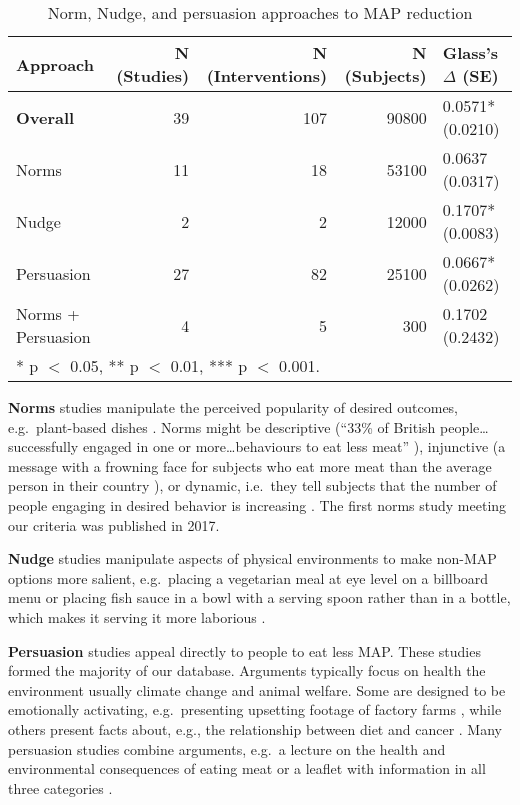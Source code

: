 \documentclass[sn-nature,pdflatex]{sn-jnl}
\begin{document}
\begin{table}[!h]
\centering
\caption{\label{tab:tab:table_one}Norm, Nudge, and persuasion approaches to MAP reduction}
\centering
\begin{tabular}[t]{lrrrl}
\toprule
Approach & N (Studies) & N (Interventions) & N (Subjects) & Glass's $\Delta$ (SE)\\
\midrule
\textbf{Overall} & 39 & 107 & 90800 & 0.0571* (0.0210)\\
Norms & 11 & 18 & 53100 & 0.0637 (0.0317)\\
Nudge & 2 & 2 & 12000 & 0.1707* (0.0083)\\
Persuasion & 27 & 82 & 25100 & 0.0667* (0.0262)\\
Norms + Persuasion & 4 & 5 & 300 & 0.1702 (0.2432)\\
\bottomrule
\multicolumn{5}{l}{\rule{0pt}{1em}* p $<$ 0.05, ** p $<$ 0.01, *** p $<$ 0.001.}\\
\end{tabular}
\end{table}

\textbf{Norms} studies
\citep{aldoh2023, allen2002, alblas2023, coker2022, griesoph2021, piester2020, sparkman2017, sparkman2020}
manipulate the perceived popularity of desired outcomes,
e.g.~plant-based dishes \citep{sparkman2017}. Norms might be descriptive
(``33\% of British people\ldots successfully engaged in one or
more\ldots behaviours to eat less meat'' \citep{aldoh2023}), injunctive
(a message with a frowning face for subjects who eat more meat than the
average person in their country \citep{alblas2023}), or dynamic,
i.e.~they tell subjects that the number of people engaging in desired
behavior is increasing
\citep{aldoh2023, coker2022, sparkman2017, sparkman2020}. The first
norms study meeting our criteria was published in 2017.

\textbf{Nudge} studies \citep{andersson2021, kanchanachitra2020}
manipulate aspects of physical environments to make non-MAP options more
salient, e.g.~placing a vegetarian meal at eye level on a billboard menu
\citep{andersson2021} or placing fish sauce in a bowl with a serving
spoon rather than in a bottle, which makes it serving it more laborious
\citep{kanchanachitra2020}.

\textbf{Persuasion} studies
\citep{kanchanachitra2020, abrahamse2007, acharya2004, berndsen2005, bertolaso2015, bianchi2022, bochmann2017, bschaden2020, carfora2023, cooney2016, fehrenbach2015, feltz2022, haile2021, hatami2018, hennessy2016, mathur2021effectiveness, norris2014, peacock2017, polanco2022, sparkman2021, jalil2023, merrill2009, weingarten2022}
appeal directly to people to eat less MAP. These studies formed the
majority of our database. Arguments typically focus on health the
environment \textemdash usually climate change \textemdash and animal
welfare. Some are designed to be emotionally activating, e.g.~presenting
upsetting footage of factory farms \citep{bertolaso2015}, while others
present facts about, e.g., the relationship between diet and cancer
\citep{hatami2018}. Many persuasion studies combine arguments, e.g.~a
lecture on the health and environmental consequences of eating meat
\citep{jalil2023} or a leaflet with information in all three categories
\citep{hennessy2016}.
\end{document}
